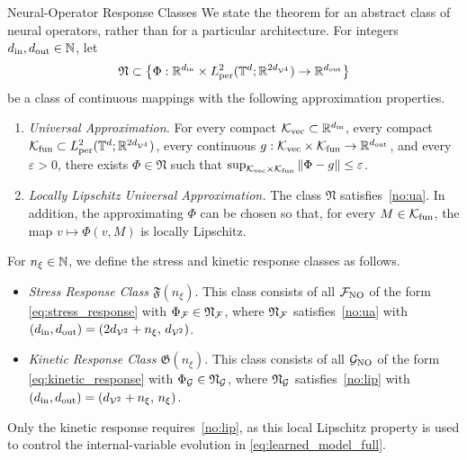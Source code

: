 \documentclass[3p, 12pt, preprint]{elsarticle}
\begin{document}
\begin{namedparagraph}{Neural-Operator Response Classes}
We state the theorem for an abstract class of neural operators, rather than for a particular architecture. For integers $d_{\mathrm{in}},d_{\mathrm{out}}\in\mathbb{N}$, let
\begin{equation*}
    \mathfrak{N}\subset\left\{\Phi:\mathbb{R}^{d_{\mathrm{in}}}\times L^2_{\mathrm{per}}(\mathbb{T}^d;\mathbb{R}^{2d_{{\mathcal{V}}^4}}) \to \mathbb{R}^{d_{\mathrm{out}}}\right\}
\end{equation*}
be a class of continuous mappings with the following approximation properties.

\begin{enumerate}[label=(A\arabic*)]
    \item\label{no:ua} \textit{Universal Approximation.} For every compact ${\mathcal{K}}_{\mathrm{vec}}\subset \mathbb{R}^{d_{\mathrm{in}}}$, every compact ${\mathcal{K}}_{\mathrm{fun}}\subset L^2_{\mathrm{per}}(\mathbb{T}^d;\mathbb{R}^{2d_{{\mathcal{V}}^4}})$, every continuous $g:{\mathcal{K}}_{\mathrm{vec}}\times {\mathcal{K}}_{\mathrm{fun}}\to\mathbb{R}^{d_{\mathrm{out}}}$, and every $\varepsilon>0$, there exists $\Phi\in\mathfrak{N}$ such that $\sup_{{\mathcal{K}}_{\mathrm{vec}}\times {\mathcal{K}}_{\mathrm{fun}}}\|\Phi-g\|\le\varepsilon$.

    \item\label{no:lip} \textit{Locally Lipschitz Universal Approximation.} The class $\mathfrak{N}$ satisfies~\ref{no:ua}. In addition, the approximating $\Phi$ can be chosen so that, for every $M\in {\mathcal{K}}_{\mathrm{fun}}$, the map $v\mapsto \Phi(v,M)$ is locally Lipschitz.
\end{enumerate}
For $n_{\xi}\in\mathbb{N}$, we define the stress and kinetic response classes as follows.
\begin{itemize}
    \item \textit{Stress Response Class $\mathfrak{F}(n_{\xi})$}. This class consists of all ${\mathcal{F}}_{\mathrm{NO}}$ of the form \cref{eq:stress_response} with $\Phi_{{\mathcal{F}}}\in\mathfrak{N}_{{\mathcal{F}}}$, where $\mathfrak{N}_{{\mathcal{F}}}$ satisfies~\ref{no:ua} with $(d_{\mathrm{in}},d_{\mathrm{out}})=(2d_{{\mathcal{V}}^2}+n_{\xi},\,d_{{\mathcal{V}}^2})$.
    \item \textit{Kinetic Response Class $\mathfrak{G}(n_{\xi})$}. This class consists of all ${\mathcal{G}}_{\mathrm{NO}}$ of the form \cref{eq:kinetic_response} with $\Phi_{{\mathcal{G}}}\in\mathfrak{N}_{{\mathcal{G}}}$, where $\mathfrak{N}_{{\mathcal{G}}}$ satisfies~\ref{no:lip} with $(d_{\mathrm{in}},d_{\mathrm{out}})=(d_{{\mathcal{V}}^2}+n_{\xi},\,n_{\xi})$.
\end{itemize}
Only the kinetic response requires~\ref{no:lip}, as this local Lipschitz property is used to control the internal-variable evolution in \cref{eq:learned_model_full}.
\end{namedparagraph}
\end{document}
